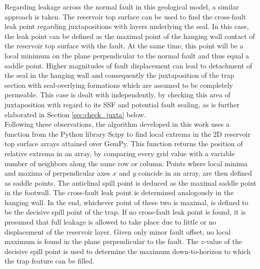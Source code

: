 			Regarding leakage across the normal fault in this geological model, a similar approach is taken. The reservoir top surface can be used to find the cross-fault leak point regarding juxtapositions with layers underlying the seal. In this case, the leak point can be defined as the maximal point of the hanging wall contact of the reservoir top surface with the fault. At the same time, this point will be a local minimum on the plane perpendicular to the normal fault and thus equal a saddle point. Higher magnitudes of fault displacement can lead to detachment of the seal in the hanging wall and consequently the juxtaposition of the trap section with seal-overlying formations which are assumed to be completely permeable. This case is dealt with independently, by checking this area of juxtaposition with regard to its SSF and potential fault sealing, as is further elaborated in Section \ref{sec:check_juxta} below.\\
			Following these observations, the algorithm developed in this work uses a function from the Python library Scipy to find local extrema in the 2D reservoir top surface arrays attained over GemPy. This function returns the position of relative extrema in an array, by comparing every grid value with a variable number of neighbors along the same row or column. Points where local minima and maxima of perpendicular axes $x$ and $y$ coincide in an array, are then defined as saddle points. The anticlinal spill point is deduced as the maximal saddle point in the footwall. The cross-fault leak point is determined analogously in the hanging wall. In the end, whichever point of these two is maximal, is defined to be the decisive spill point of the trap. If no cross-fault leak point is found, it is presumed that full leakage is allowed to take place due to little or no displacement of the reservoir layer. Given only minor fault offset, no local maximum is found in the plane perpendicular to the fault. The $z$-value of the decisive spill point is used to determine the maximum down-to-horizon to which the trap feature can be filled.\\
